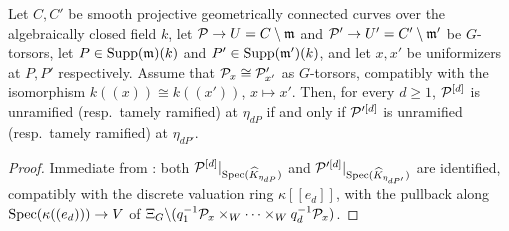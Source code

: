 \begin{cor}[Reduction to $\bP^1$]\label{cor:reduction_to_P1}
    Let $C, C'$ be smooth projective geometrically connected curves over the algebraically closed field $k$, let
    $\mathcal{P} \to U = C \setminus \mathfrak{m}$ and $\mathcal{P}' \to U' = C' \setminus \mathfrak{m}'$ be $G$-torsors, let
    $P \in \mathrm{Supp}(\mathfrak{m})(k)$ and $P' \in \mathrm{Supp}(\mathfrak{m}')(k)$, and let $x, x'$ be uniformizers at $P, P'$
    respectively. Assume that $\mathcal{P}_x \cong \mathcal{P}'_{x'}$ as $G$-torsors, compatibly with the isomorphism
    $k((x)) \cong k((x'))$, $x \mapsto x'$.
    Then, for every $d\geq1$, $\mathcal{P}^{[d]}$ is unramified
    (resp.\ tamely ramified) at $\eta_{dP}$ if and only if
    $\mathcal{P}'^{[d]}$ is unramified (resp.\ tamely ramified) at $\eta_{dP'}$.
\end{cor}
\begin{proof}
    Immediate from : both $\mathcal{P}^{[d]}|_{\operatorname{Spec}(\widehat{K}_{\eta_{dP}})}$ and
    $\mathcal{P}'^{[d]}|_{\operatorname{Spec}(\widehat{K}_{\eta_{dP'}})}$ are identified, compatibly with the discrete valuation ring
    $\kappa[[e_d]]$, with the pullback along $\operatorname{Spec}(\kappa((e_d))) \to V$ of
    $\Xi_G \backslash (q_1^{-1}\mathcal{P}_x \times_W \cdots \times_W q_d^{-1}\mathcal{P}_x)$.
\end{proof}
